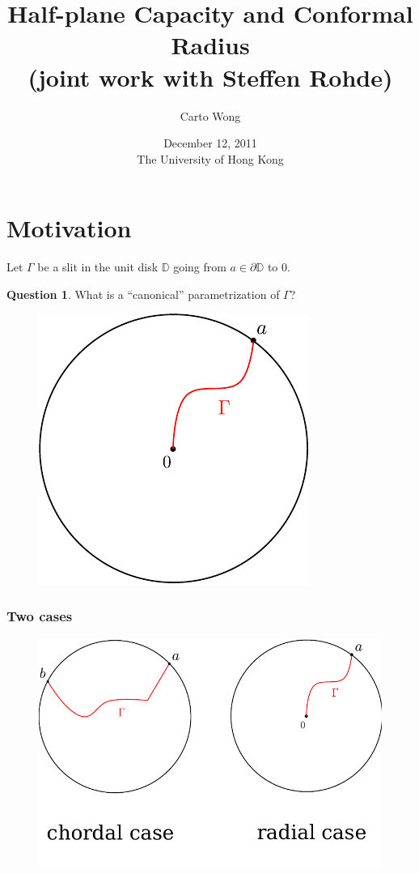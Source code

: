\documentclass[xcolor=pdftex,dvipsnames,table]{beamer}
\title{Half-plane Capacity and Conformal Radius\\
       (joint work with Steffen Rohde)}
\author{Carto Wong}
\institute{University of Washington}
\date{December 12, 2011\\The University of Hong Kong}
\newcommand{\bbD}{\mathbb{D}}
\newcommand{\gR}{\Gamma}
\theoremstyle{definition}
\newtheorem{question}{Question}
\begin{document}
\maketitle

\section{Motivation}

\begin{frame}
  Let $\gR$ be a slit in the unit disk $\bbD$ going from $a \in \partial \bbD$ to 0.
  \begin{question}
    What is a ``canonical'' parametrization of $\gR$?
  \end{question}
  \begin{figure}
    \includegraphics[scale=0.8]{radialSlit.pdf}
  \end{figure}
\end{frame}

\begin{frame}
  \frametitle{Two cases}
  \begin{figure}
    \includegraphics[scale=0.6]{twoCases.pdf}
  \end{figure}
\end{frame}
\end{document}
